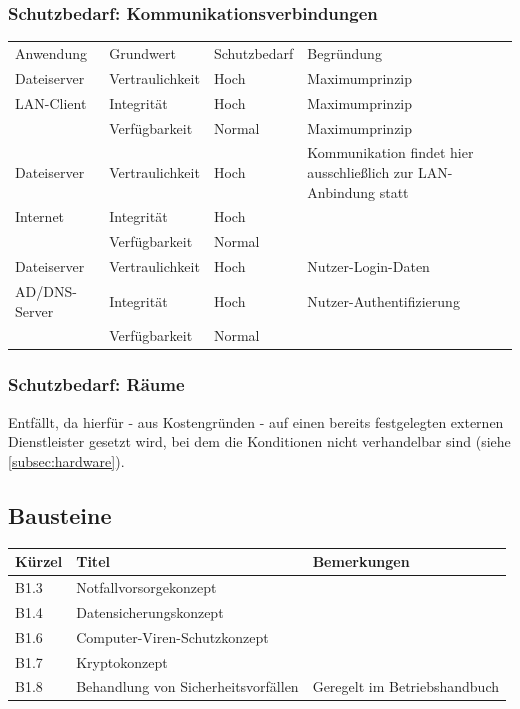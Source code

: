 \subsubsection{Schutzbedarf: Kommunikationsverbindungen}
\begin{minipage}{\textwidth}
\begin{center}
\begin{tabular}{p{3.5cm}llp{6.3cm}}
\toprule
Anwendung & Grundwert & Schutzbedarf & Begründung \\
Dateiserver & Vertraulichkeit & Hoch & Maximumprinzip \\
LAN-Client & Integrität & Hoch & Maximumprinzip \\
 & Verfügbarkeit & Normal & Maximumprinzip \\
Dateiserver & Vertraulichkeit & Hoch & Kommunikation findet hier ausschließlich zur LAN-Anbindung statt \\
Internet & Integrität & Hoch &  \\
 & Verfügbarkeit & Normal &  \\
Dateiserver & Vertraulichkeit & Hoch & Nutzer-Login-Daten \\
AD/DNS-Server & Integrität & Hoch & Nutzer-Authentifizierung \\
 & Verfügbarkeit & Normal &  \\
\bottomrule
\end{tabular}
\end{center}
\end{minipage}
\bigskip

\subsubsection{Schutzbedarf: Räume}
Entfällt, da hierfür - aus Kostengründen - auf einen bereits festgelegten externen Dienstleister gesetzt wird, bei dem die Konditionen nicht verhandelbar sind (siehe \ref{subsec:hardware}).

\subsection{Bausteine}
\begin{minipage}{\textwidth}
\begin{center}
\begin{tabular}{p{1cm}p{5cm}p{9cm}}
\toprule
Kürzel 	& Titel & Bemerkungen \\
\midrule
B1.3 	& Notfallvorsorgekonzept & \\
B1.4 	& Datensicherungskonzept & \\
B1.6 	& Computer-Viren-Schutzkonzept & \\
B1.7 	& Kryptokonzept	& \\
B1.8 	& Behandlung von \newline Sicherheitsvorfällen & Geregelt im Betriebshandbuch \\
\bottomrule
\end{tabular}
\end{center}
\end{minipage}
\bigskip

